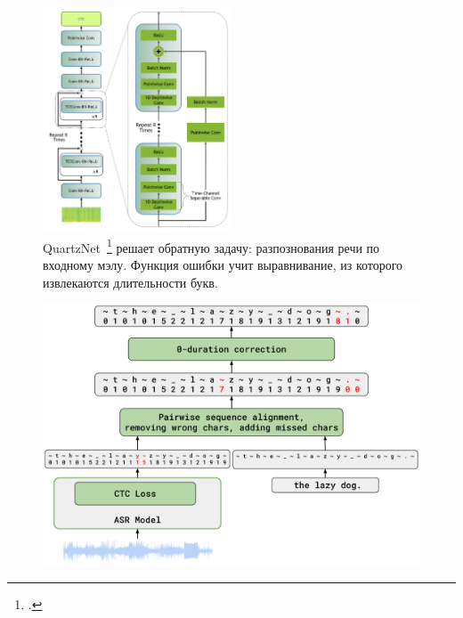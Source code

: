 \begin{frame}
\begin{figure}[H]
\centering
\includegraphics[width=0.5\textwidth]{images/qn.png}
\caption{QuartzNet~\footcite{quartznet} решает обратную задачу: разпознования речи по входному мэлу. Функция ошибки учит выравнивание, из которого извлекаются длительности букв.}
\end{figure}
\end{frame}

\begin{frame}
\begin{figure}[H]
\centering
\includegraphics[width=1.0\textwidth]{images/alignment.png}
\end{figure}
\end{frame}

